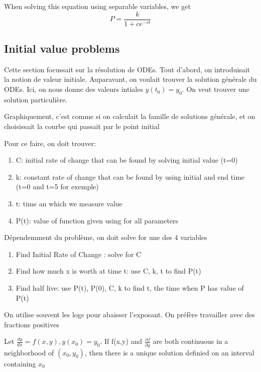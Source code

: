 \documentclass{article}
\begin{document}
When solving this equation using separable variables, we get
$$ P = \frac{k}{1+ce^{-rt}} $$

\subsection{Initial value problems}

Cette section focussait sur la résolution de ODEs. Tout d'abord, on
introduisait la notion de valeur initiale. Auparavant, on voulait
trouver la solution générale du ODEs. Ici, on nous donne des valeurs
intiales $ y(t_0) = y_0 $. On veut trouver une solution particulière.

\begin{intuition}
    Graphiquement, c'est comme si on calculait la famille de solutions
    générale, et on choisissait la courbe qui passait par le point initial
\end{intuition}

Pour ce faire, on doit trouver:
\begin{enumerate}
    \item C: initial rate of change that can be found by solving
	initial value (t=0)
    \item k: constant rate of change that can be found by using
	initial and end time (t=0 and t=5 for exemple)
    \item t: time an which we measure value
    \item P(t): value of function given using for all parameters
\end{enumerate}

Dépendemment du problème, on doit solve for une des 4 variables
\begin{enumerate}
    \item Find Initial Rate of Change : solve for C
    \item Find how much x is worth at time t: use C, k, t to find P(t)
    \item Find half live: use P(t), P(0), C, k to find t, the time when
	P has value of P(t)
\end{enumerate}

\begin{remark}
    On utilise souvent les logs pour abaisser l'exposant. On préfère
    travailler avec des fractions positives
\end{remark}

\begin{theorem}
    Let $ \frac{dy}{dx}  = f(x,y), y(x_0)=y_0$. If f(x,y) and
    $ \frac{\partial f}{\partial y} $ are both continuous in a
    neighborhood of $(x_0, y_0)$, then there is a unique solution
    definied on an interval containing $x_0$
\end{theorem}
\end{document}
